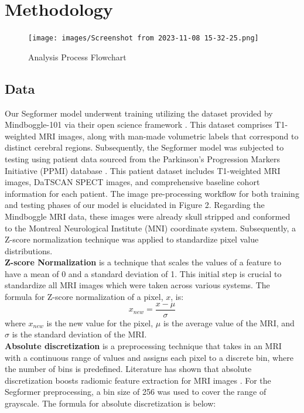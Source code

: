 \section{Methodology}
\begin{figure}[h!/0]
    \centering
    \texttt{[image: images/Screenshot from 2023-11-08 15-32-25.png]}
    \caption{Analysis Process Flowchart}
    \label{fig:Analysis Process Flowchart}
\end{figure}
\subsection{Data}
Our Segformer model underwent training utilizing the dataset provided by Mindboggle-101 via their open science framework \cite{10.3389/fnins.2012.00171}. This dataset comprises T1-weighted MRI images, along with man-made volumetric labels that correspond to distinct cerebral regions. Subsequently, the Segformer model was subjected to testing using patient data sourced from the Parkinson's Progression Markers Initiative (PPMI) database \cite{PPMI}. This patient dataset includes T1-weighted MRI images, DaTSCAN SPECT images, and comprehensive baseline cohort information for each patient. The image pre-processing workflow for both training and testing phases of our model is elucidated in Figure 2. Regarding the Mindboggle MRI data, these images were already skull stripped and conformed to the Montreal Neurological Institute (MNI) coordinate system. Subsequently, a Z-score normalization technique was applied to standardize pixel value distributions. \\
\textbf{Z-score Normalization} is a technique that scales the values of a feature to have a mean of 0 and a standard deviation of 1. This initial step is crucial to standardize all MRI images which were taken across various systems. The formula for Z-score normalization of a pixel, $x$, is:
\begin{equation}
 x_{new} = \frac{x-\mu}{\sigma}
\end{equation}
where $x_{new}$ is the new value for the pixel, $\mu$ is the average value of the MRI, and $\sigma$ is the standard deviation of the MRI.\\
\textbf{Absolute discretization} is a preprocessing technique that takes in an MRI with a continuous range of values and assigns each pixel to a discrete bin, where the number of bins is predefined. Literature has shown that absolute discretization boosts radiomic feature extraction for MRI images \cite{10.1371/journal.pone.0213459}. For the Segformer preprocessing, a bin size of 256 was used to cover the range of grayscale. The formula for absolute discretization is below:
